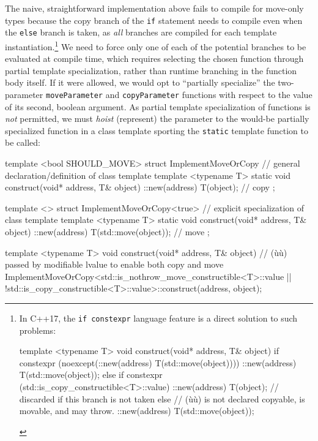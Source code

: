 \noindent The naive, straightforward implementation above fails to compile for
move-only types because the copy branch of the \lstinline!if! statement
needs to compile even when the \lstinline!else! branch is taken, as
\emph{all} branches are compiled for each template
instantiation.{\cprotect\footnote{In C++17, the
\lstinline!if!~\lstinline!constexpr! language feature is a direct solution
to such problems:

\begin{emcppslisting}[style=footcode]
template <typename T>
void construct(void* address, T& object)
{
    if constexpr (noexcept(::new(address) T(std::move(object))))
    {
        ::new(address) T(std::move(object));
    }
    else if constexpr (std::is_copy_constructible<T>::value)
    {
        ::new(address) T(object);  // discarded if this branch is not taken
    }
    else // (ù{}ù) is not declared copyable, is movable, and may throw.
    {
        ::new(address) T(std::move(object));
    }
}
\end{emcppslisting}
      }} We need to force only one of each of the potential branches to
be evaluated at compile time, which requires selecting the chosen
function through partial template specialization, rather than runtime
branching in the function body itself. If it were allowed, we would opt
to ``partially specialize'' the two-parameter \lstinline!moveParameter! and
\lstinline!copyParameter! functions with respect to the value of its
second, boolean argument. As partial template specialization of
functions is \emph{not} permitted, we must \emph{hoist} (represent) the
parameter to the would-be partially specialized function in a class
template sporting the \lstinline!static! template function to be called:

\begin{emcppslisting}
template <bool SHOULD_MOVE>
struct ImplementMoveOrCopy  // general declaration/definition of class template
{
    template <typename T>
    static void construct(void* address, T& object)
    {
        ::new(address) T(object); // copy
    }
};

template <>
struct ImplementMoveOrCopy<true>  // explicit specialization of class template
{
    template <typename T>
    static void construct(void* address, T& object)
    {
        ::new(address) T(std::move(object));   // move
    }
};

template <typename T>
void construct(void* address, T& object)
     // (ù{}ù) passed by modifiable lvalue to enable both copy and move
{
    ImplementMoveOrCopy<std::is_nothrow_move_constructible<T>::value ||
        !std::is_copy_constructible<T>::value>::construct(address, object);
}
\end{emcppslisting}
    

